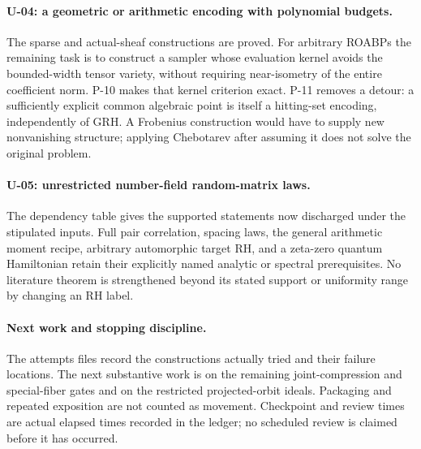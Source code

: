 \paragraph{U-04: a geometric or arithmetic encoding with polynomial budgets.}
The sparse and actual-sheaf constructions are proved. For arbitrary ROABPs the remaining task is to construct a sampler whose evaluation kernel avoids the bounded-width tensor variety, without requiring near-isometry of the entire coefficient norm. P-10 makes that kernel criterion exact. P-11 removes a detour: a sufficiently explicit common algebraic point is itself a hitting-set encoding, independently of GRH. A Frobenius construction would have to supply new nonvanishing structure; applying Chebotarev after assuming it does not solve the original problem.

\paragraph{U-05: unrestricted number-field random-matrix laws.}
The dependency table gives the supported statements now discharged under the stipulated inputs. Full pair correlation, spacing laws, the general arithmetic moment recipe, arbitrary automorphic target RH, and a zeta-zero quantum Hamiltonian retain their explicitly named analytic or spectral prerequisites. No literature theorem is strengthened beyond its stated support or uniformity range by changing an RH label.

\paragraph{Next work and stopping discipline.}
The attempts files record the constructions actually tried and their failure locations. The next substantive work is on the remaining joint-compression and special-fiber gates and on the restricted projected-orbit ideals. Packaging and repeated exposition are not counted as movement. Checkpoint and review times are actual elapsed times recorded in the ledger; no scheduled review is claimed before it has occurred.
